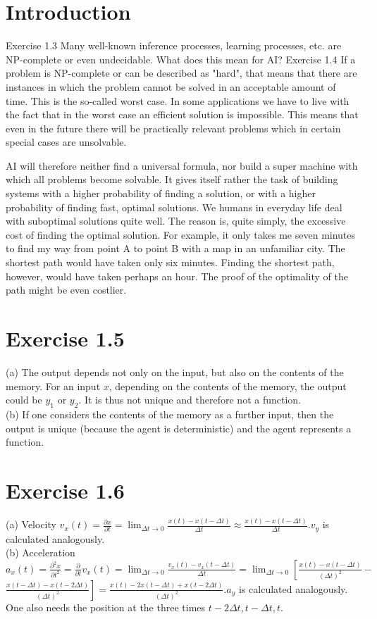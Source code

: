 \documentclass[10pt]{book}
\begin{document}
\section{Introduction}
Exercise 1.3 Many well-known inference processes, learning processes, etc. are NP-complete or even undecidable. What does this mean for AI?
Exercise 1.4 If a problem is NP-complete or can be described as "hard", that means that there are instances in which the problem cannot be solved in an acceptable amount of time. This is the so-called worst case. In some applications we have to live with the fact that in the worst case an efficient solution is impossible. This means that even in the future there will be practically relevant problems which in certain special cases are unsolvable.

AI will therefore neither find a universal formula, nor build a super machine with which all problems become solvable. It gives itself rather the task of building systems with a higher probability of finding a solution, or with a higher probability of finding fast, optimal solutions. We humans in everyday life deal with suboptimal solutions quite well. The reason is, quite simply, the excessive cost of finding the optimal solution. For example, it only takes me seven minutes to find my way from point A to point B with a map in an unfamiliar city. The shortest path would have taken only six minutes. Finding the shortest path, however, would have taken perhaps an hour. The proof of the optimality of the path might be even costlier.

\section{Exercise 1.5}
(a) The output depends not only on the input, but also on the contents of the memory. For an input $x$, depending on the contents of the memory, the output could be $y_{1}$ or $y_{2}$. It is thus not unique and therefore not a function.\\
(b) If one considers the contents of the memory as a further input, then the output is unique (because the agent is deterministic) and the agent represents a function.

\section{Exercise 1.6}
(a) Velocity $v_{x}(t)=\frac{\partial x}{\partial t}=\lim _{\Delta t \rightarrow 0} \frac{x(t)-x(t-\Delta t)}{\Delta t} \approx \frac{x(t)-x(t-\Delta t)}{\Delta t} . v_{y}$ is calculated analogously.\\
(b) Acceleration $a_{x}(t)=\frac{\partial^{2} x}{\partial t^{2}}=\frac{\partial}{\partial t} v_{x}(t)=\lim _{\Delta t \rightarrow 0} \frac{v_{x}(t)-v_{x}(t-\Delta t)}{\Delta t}=\lim _{\Delta t \rightarrow 0}\left[\frac{x(t)-x(t-\Delta t)}{(\Delta t)^{2}}-\right.$ $\left.\frac{x(t-\Delta t)-x(t-2 \Delta t)}{(\Delta t)^{2}}\right]=\frac{x(t)-2 x(t-\Delta t)+x(t-2 \Delta t)}{(\Delta t)^{2}} . a_{y}$ is calculated analogously. One also needs the position at the three times $t-2 \Delta t, t-\Delta t, t$.
\end{document}
